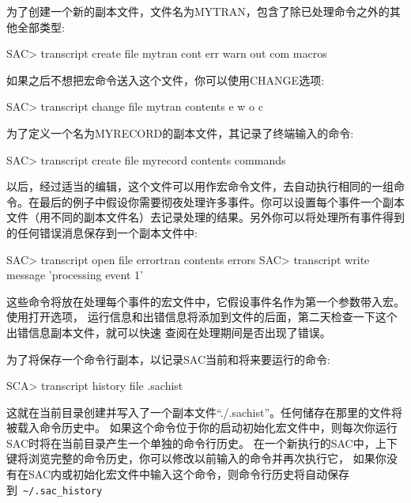 为了创建一个新的副本文件，文件名为MYTRAN，包含了除已处理命令之外的其他全部类型:
\begin{SACCode}
SAC> transcript create file mytran cont err warn out com macros
\end{SACCode}

如果之后不想把宏命令送入这个文件，你可以使用CHANGE选项:
\begin{SACCode}
SAC> transcript change file mytran contents e w o c
\end{SACCode}

为了定义一个名为MYRECORD的副本文件，其记录了终端输入的命令:
\begin{SACCode}
SAC> transcript create file myrecord contents commands
\end{SACCode}

以后，经过适当的编辑，这个文件可以用作宏命令文件，去自动执行相同的一组命令。在最后的例子中假设你需要彻夜处理许多事件。你可以设置每个事件一个副本文件（用不同的副本文件名）去记录处理的结果。另外你可以将处理所有事件得到的任何错误消息保存到一个副本文件中:
\begin{SACCode}
SAC> transcript open file errortran contents errors
SAC> transcript write message 'processing event 1'
\end{SACCode}

这些命令将放在处理每个事件的宏文件中，它假设事件名作为第一个参数带入宏。使用打开选项，
运行信息和出错信息将添加到文件的后面，第二天检查一下这个出错信息副本文件，就可以快速
查阅在处理期间是否出现了错误。

为了将保存一个命令行副本，以记录SAC当前和将来要运行的命令:
\begin{SACCode}
SCA> transcript history file .sachist
\end{SACCode}
这就在当前目录创建并写入了一个副本文件``./.sachist''。任何储存在那里的文件将被载入命令历史中。
如果这个命令位于你的启动初始化宏文件中，则每次你运行SAC时将在当前目录产生一个单独的命令行历史。
在一个新执行的SAC中，上下键将浏览完整的命令历史，你可以修改以前输入的命令并再次执行它，
如果你没有在SAC内或初始化宏文件中输入这个命令，则命令行历史将自动保存到~\verb+~/.sac_history+
